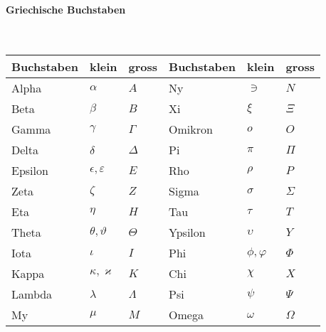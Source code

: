\paragraph{Griechische Buchstaben}\mbox{}\\
\begin{tabularx}{\columnwidth}{@{}Xll|Xll@{}}
	\hline
	Buchstaben & klein                  & gross     & Buchstaben & klein          & gross    \\ \hline
	Alpha      & $\alpha$               & $A$       & Ny         & $\ni$          & $N$      \\ \hline
	Beta       & $\beta$                & $B$       & Xi         & $\xi$          & $\Xi$    \\ \hline
	Gamma      & $\gamma$               & $\Gamma$  & Omikron    & $o$            & $O$      \\ \hline
	Delta      & $\delta$               & $\Delta$  & Pi         & $\pi$          & $\Pi$    \\ \hline
	Epsilon    & $\epsilon,\varepsilon$ & $E$       & Rho        & $\rho$         & $P$      \\ \hline
	Zeta       & $\zeta$                & $Z$       & Sigma      & $\sigma$       & $\Sigma$ \\ \hline
	Eta        & $\eta$                 & $H$       & Tau        & $\tau$         & $T$      \\ \hline
	Theta      & $\theta,\vartheta$     & $\Theta$  & Ypsilon    & $\upsilon$     & $Y$      \\ \hline
	Iota       & $\iota$                & $I$       & Phi        & $\phi,\varphi$ & $\Phi$   \\ \hline
	Kappa      & $\kappa,\varkappa$     & $K$       & Chi        & $\chi$         & $X$      \\ \hline
	Lambda     & $\lambda$              & $\Lambda$ & Psi        & $\psi$         & $\Psi$   \\ \hline
	My         & $\mu$                  & $M$       & Omega      & $\omega$       & $\Omega$ \\ \hline
\end{tabularx}
\vspace{1mm}
